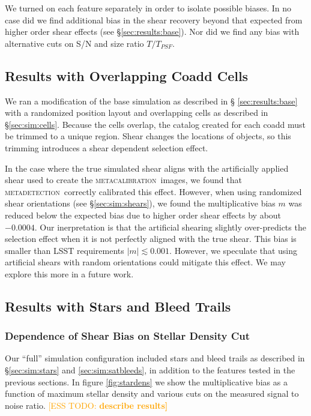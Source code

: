 \documentclass[iop, twocolappendix, appendixfloats, numberedappendix, apj]{hackemulateapj}
\newcommand{\esstodo}[1]{\textcolor{orange}{[ESS TODO: \bf #1]}}
\newcommand{\mcal}{\textsc{metacalibration}}
\newcommand{\mdet}{\textsc{metadetection}}
\begin{document}
We turned on each feature separately in order to isolate possible biases.  In
no case did we find additional bias in the shear recovery beyond that expected
from higher order shear effects (see \S \ref{sec:results:base}).  Nor did we
find any bias with alternative cuts on S/N and size ratio $T/T_{PSF}$.

\subsection{Results with Overlapping Coadd Cells} \label{sec:results:cells}

We ran a modification of the base simulation as described in \S
\ref{sec:results:base} with a randomized position layout and overlapping cells
as described in \S \ref{sec:sim:cells}.  Because the cells overlap, the catalog
created for each coadd must be trimmed to a unique region.  Shear changes the
locations of objects, so this trimming introduces a shear dependent selection
effect.

In the case where the true simulated shear aligns with the artificially applied
shear used to create the \mcal\ images, we found that \mdet\ correctly
calibrated this effect.  However, when using randomized shear orientations (see
\S \ref{sec:sim:shears}), we found the multiplicative bias $m$ was reduced
below the expected bias due to higher order shear effects by about $-0.0004$.
Our inerpretation is that the artificial shearing slightly over-predicts the
selection effect when it is not perfectly aligned with the true shear.  This
bias is smaller than LSST requirements $|m| \lesssim 0.001$.  However, we
speculate that using artificial shears with random orientations could mitigate
this effect.  We may explore this more in a future work.

\subsection{Results with Stars and Bleed Trails} \label{sec:results:full}

\subsubsection{Dependence of Shear Bias on Stellar Density Cut} \label{sec:results:sdens}

Our ``full'' simulation configuration included stars and bleed trails as
described in \S \ref{sec:sim:stars} and \ref{sec:sim:satbleeds}, in addition to
the features tested in the previous sections.  In figure \ref{fig:stardens} we
show the multiplicative bias as a function of maximum stellar density and various
cuts on the measured signal to noise ratio. \esstodo{describe results}
\end{document}
